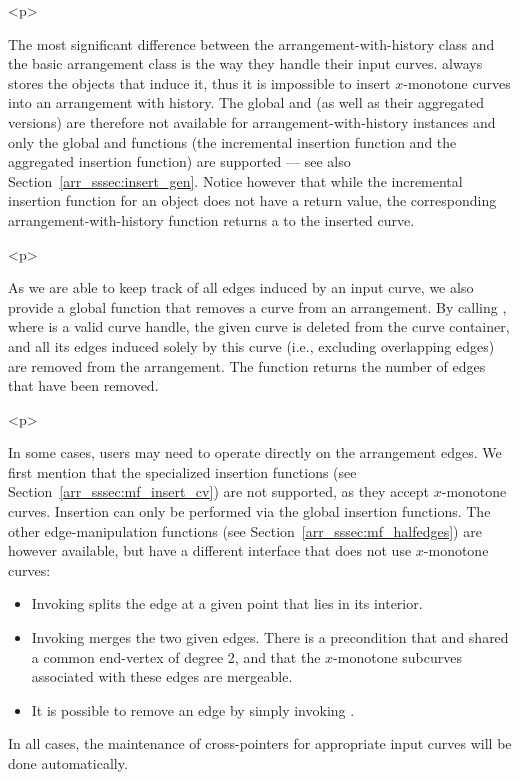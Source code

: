 \begin{ccHtmlOnly}<p>\end{ccHtmlOnly}
The most significant difference between the arrangement-with-history class
and the basic arrangement class is the way they handle their input curves.
 always stores the  objects
that induce it, thus it is impossible to insert $x$-monotone curves into
an arrangement with history. The global 
and  (as well as their aggregated versions)
are therefore not available for arrangement-with-history instances
and only the global  and  functions
(the incremental insertion function and the aggregated insertion function)
are supported --- see also Section~\ref{arr_sssec:insert_gen}. Notice however
that while the incremental insertion function  for
an  object  does not have a return value,
the corresponding arrangement-with-history function returns a
 to the inserted curve.

\begin{ccHtmlOnly}<p>\end{ccHtmlOnly}
As we are able to keep track of all edges induced by an input curve, we also
provide a global function that removes a curve from an arrangement. By calling
, where  is a valid curve handle, the given curve
is deleted from the curve container, and all its edges induced solely by
this curve (i.e., excluding overlapping edges) are removed from the 
arrangement. The function returns the number of edges that have been removed.

\begin{ccHtmlOnly}<p>\end{ccHtmlOnly}
In some cases, users may need to operate directly on the arrangement edges.
We first mention that the specialized insertion functions (see 
Section~\ref{arr_sssec:mf_insert_cv}) are not supported, as they accept
$x$-monotone curves. Insertion can only be performed via the global 
insertion functions. The other edge-manipulation functions 
(see Section~\ref{arr_sssec:mf_halfedges}) are however available, but have 
a different interface that does not use $x$-monotone curves:
\begin{itemize}
\item Invoking  splits the edge  at a given point
 that lies in its interior.
\item Invoking  merges the two given edges. There is
a precondition that  and  shared a common end-vertex of degree
2, and that the $x$-monotone subcurves associated with these edges are
mergeable.
\item It is possible to remove an edge by simply invoking
.
\end{itemize}
In all cases, the maintenance of cross-pointers for appropriate input
curves will be done automatically.

